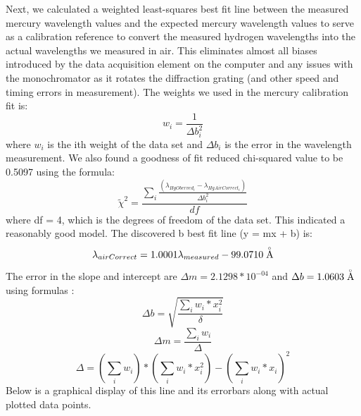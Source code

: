 \documentclass{article}
\begin{document}
    Next, we calculated a weighted least-squares best fit line between the measured mercury wavelength values and the expected mercury wavelength values to serve as a calibration reference to convert the measured hydrogen wavelengths into the actual wavelengths we measured in air. This eliminates almost all biases introduced by the data acquisition element on the computer and any issues with the monochromator as it rotates the diffraction grating (and other speed and timing errors in measurement). The weights we used in the mercury calibration fit is:
    \begin{equation}
        w_i = \frac{1}{\Delta b_i^2}
    \end{equation}
    where $w_i$ is the ith weight of the data set and $\Delta b_i$ is the error in the wavelength measurement. We also found a goodness of fit reduced chi-squared value to be 0.5097 using the formula:
    \begin{equation}
        \tilde{\chi}^2 = \frac{\sum_i \frac{(\lambda_{HgOberved_i} - \lambda_{HgAirCorrect_i})}{\Delta b_i^2}}{df}
    \end{equation}
    where df = 4, which is the degrees of freedom of the data set.
    This indicated a reasonably good model. The discovered b best fit line (y = mx + b) is:
    \begin{equation}
        \lambda_{airCorrect} = 1.0001 \lambda_{measured} -99.0710 \buildrel _\circ \over {\mathrm{A}}
    \end{equation}
    The error in the slope and intercept are $\Delta m = 2.1298*10^{-04}$ and $\Delta b = 1.0603 \buildrel _\circ \over {\mathrm{A}}$ using formulas \cite{err}: 
    \begin{equation}
        \Delta b = \sqrt{\frac{\sum_i w_i*x_i^2}{\delta}}
    \end{equation}
    \begin{equation}
        \Delta m = \frac{\sum_i w_i}{\Delta}
    \end{equation}\begin{equation}
        \Delta = (\sum_i w_i)*(\sum_i w_i*x_i^2)-(\sum_i w_i*x_i)^2
    \end{equation} Below is a graphical display of this line and its errorbars along with actual plotted data points.
\end{document}
